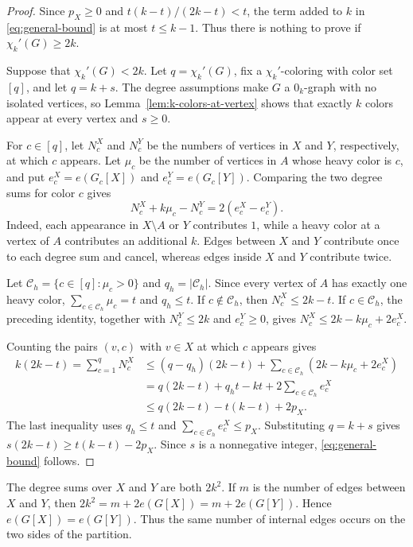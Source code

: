 \documentclass[10pt,a4paper]{amsart}
\newcommand{\chik}{\chi_k'}
\begin{document}
\begin{proof}
Since $p_X\geq0$ and $t(k-t)/(2k-t)<t$, the term added to $k$ in
\eqref{eq:general-bound} is at most $t\leq k-1$. Thus there is nothing
to prove if $\chik(G)\geq2k$.

Suppose that $\chik(G)<2k$. Let $q=\chik(G)$, fix a
$\chi_k'$-coloring with color set $[q]$, and let $q=k+s$. The degree
assumptions make $G$ a $0_k$-graph with no isolated vertices, so
Lemma~\ref{lem:k-colors-at-vertex} shows that exactly $k$ colors appear
at every vertex and $s\geq0$.

For $c\in[q]$, let $N_c^X$ and $N_c^Y$ be the numbers of vertices in
$X$ and $Y$, respectively, at which $c$ appears. Let $\mu_c$ be the
number of vertices in $A$ whose heavy color is $c$, and put
$e_c^X=e(G_c[X])$ and $e_c^Y=e(G_c[Y])$. Comparing the two degree sums
for color $c$ gives
\[
N_c^X+k\mu_c-N_c^Y=2(e_c^X-e_c^Y).
\]
Indeed, each appearance in $X\setminus A$ or $Y$ contributes $1$, while
a heavy color at a vertex of $A$ contributes an additional $k$. Edges
between $X$ and $Y$ contribute once to each degree sum and cancel,
whereas edges inside $X$ and $Y$ contribute twice.

Let $\mathcal C_h=\{c\in[q]:\mu_c>0\}$ and
$q_h=|\mathcal C_h|$. Since every vertex of $A$ has exactly one heavy
color, $\sum_{c\in\mathcal C_h}\mu_c=t$ and $q_h\leq t$. If
$c\notin\mathcal C_h$, then $N_c^X\leq2k-t$. If
$c\in\mathcal C_h$, the preceding identity, together with
$N_c^Y\leq2k$ and $e_c^Y\geq0$, gives
$N_c^X\leq2k-k\mu_c+2e_c^X$.

Counting the pairs $(v,c)$ with $v\in X$ at which $c$ appears gives
\begin{align*}
k(2k-t)=\sum_{c=1}^{q}N_c^X
&\leq (q-q_h)(2k-t)
 +\sum_{c\in\mathcal C_h}(2k-k\mu_c+2e_c^X)\\
&=q(2k-t)+q_ht-kt
 +2\sum_{c\in\mathcal C_h}e_c^X\\
&\leq q(2k-t)-t(k-t)+2p_X.
\end{align*}
The last inequality uses $q_h\leq t$ and
$\sum_{c\in\mathcal C_h}e_c^X\leq p_X$. Substituting $q=k+s$ gives
$s(2k-t)\geq t(k-t)-2p_X$. Since $s$ is a nonnegative integer,
\eqref{eq:general-bound} follows.
\end{proof}

The degree sums over $X$ and $Y$ are both $2k^2$. If $m$ is the number
of edges between $X$ and $Y$, then
$2k^2=m+2e(G[X])=m+2e(G[Y])$. Hence
$e(G[X])=e(G[Y])$. Thus the same number of internal edges occurs on the
two sides of the partition.
\end{document}
